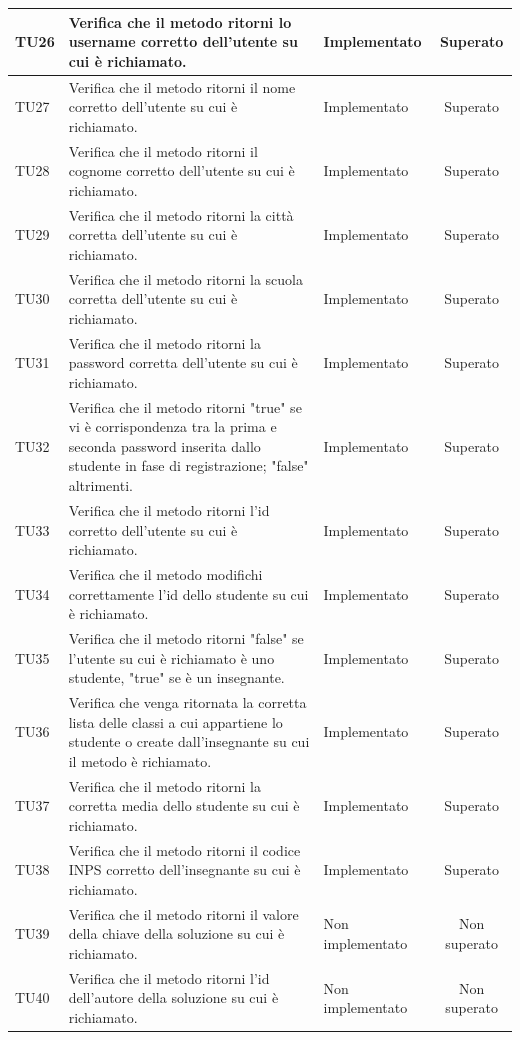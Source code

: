 \begin{longtable}{|>{\centering\arraybackslash}m{1.6cm}|>{\centering\arraybackslash}m{6.41cm}|>{\centering\arraybackslash}m{3.1cm}| c |}
		TU26 & Verifica che il metodo ritorni lo username corretto dell'utente su cui è richiamato. & Implementato & Superato \\ \hline
		TU27 & Verifica che il metodo ritorni il nome corretto dell'utente su cui è richiamato. & Implementato & Superato  \\ \hline
		TU28 & Verifica che il metodo ritorni il cognome corretto dell'utente su cui è richiamato. & Implementato & Superato  \\ \hline
		TU29 & Verifica che il metodo ritorni la città corretta dell'utente su cui è richiamato. & Implementato & Superato  \\ \hline
		TU30 & Verifica che il metodo ritorni la scuola corretta dell'utente su cui è richiamato. & Implementato & Superato  \\ \hline
		TU31 & Verifica che il metodo ritorni la password corretta dell'utente su cui è richiamato. & Implementato & Superato  \\ \hline
		TU32 & Verifica che il metodo ritorni "true" se vi è corrispondenza tra la prima e seconda password inserita dallo studente in fase di registrazione; "false" altrimenti. & Implementato & Superato  \\ \hline
		TU33 & Verifica che il metodo ritorni l'id corretto dell'utente su cui è richiamato. & Implementato & Superato  \\ \hline
		TU34 & Verifica che il metodo modifichi correttamente l'id dello studente su cui è richiamato. & Implementato & Superato  \\ \hline
		TU35 & Verifica che il metodo ritorni "false" se l'utente su cui è richiamato è uno studente, "true" se è un insegnante. & Implementato & Superato \\ \hline
		TU36 & Verifica che venga ritornata la corretta lista delle classi a cui appartiene lo studente o create dall'insegnante su cui il metodo è richiamato. & Implementato & Superato \\ \hline
		TU37 & Verifica che il metodo ritorni la corretta media dello studente su cui è richiamato. & Implementato & Superato  \\ \hline
		TU38 & Verifica che il metodo ritorni il codice INPS corretto dell'insegnante su cui è richiamato. & Implementato & Superato  \\ \hline
		TU39 & Verifica che il metodo ritorni il valore della chiave della soluzione su cui è richiamato. & Non implementato & Non superato \\ \hline
		TU40 & Verifica che il metodo ritorni l'id dell'autore della soluzione su cui è richiamato.& Non implementato & Non superato \\ \hline

\end{longtable}
